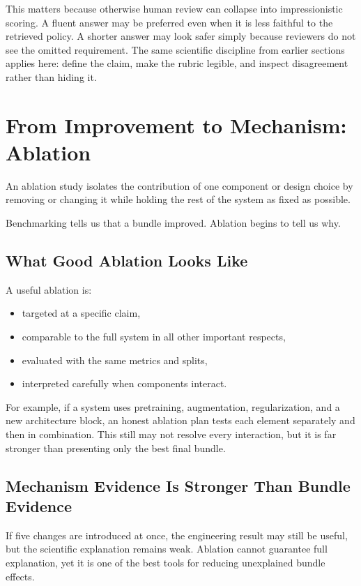 This matters because otherwise human review can collapse into impressionistic scoring. A fluent answer may be preferred even when it is less faithful to the retrieved policy. A shorter answer may look safer simply because reviewers do not see the omitted requirement. The same scientific discipline from earlier sections applies here: define the claim, make the rubric legible, and inspect disagreement rather than hiding it.

\section{From Improvement to Mechanism: Ablation}

\begin{definition}
An ablation study isolates the contribution of one component or design choice by removing or changing it while holding the rest of the system as fixed as possible.
\end{definition}

Benchmarking tells us that a bundle improved. Ablation begins to tell us why.

\subsection{What Good Ablation Looks Like}

A useful ablation is:
\begin{itemize}[leftmargin=*]
\item targeted at a specific claim,
\item comparable to the full system in all other important respects,
\item evaluated with the same metrics and splits,
\item interpreted carefully when components interact.
\end{itemize}

For example, if a system uses pretraining, augmentation, regularization, and a new architecture block, an honest ablation plan tests each element separately and then in combination. This still may not resolve every interaction, but it is far stronger than presenting only the best final bundle.

\subsection{Mechanism Evidence Is Stronger Than Bundle Evidence}

If five changes are introduced at once, the engineering result may still be useful, but the scientific explanation remains weak. Ablation cannot guarantee full explanation, yet it is one of the best tools for reducing unexplained bundle effects.

